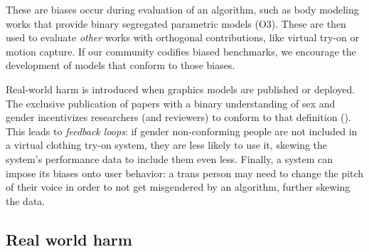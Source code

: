 \documentclass[sigconf,balance=false]{acmart}
\begin{document}

 These are biases occur during evaluation of an algorithm, such as body modeling works that provide binary segregated parametric models (O3). These are then used to evaluate \emph{other} works with orthogonal contributions, like virtual try-on or motion capture. If our community codifies biased benchmarks, we encourage the development of models that conform to those biases.




 Real-world harm is introduced when graphics models are published or deployed. The exclusive publication of papers with a binary understanding of sex and gender incentivizes researchers (and reviewers) to conform to that definition (\binary).
This leads to \emph{feedback loops}: if gender non-conforming people are not included in a virtual clothing try-on system, they are less likely to use it, skewing the system's performance data to include them even less. Finally, a system can impose its biases onto user behavior: a trans person may need to change the pitch of their voice in order to not get misgendered by an algorithm, further skewing the data.

\subsection{Real world harm}
\end{document}
